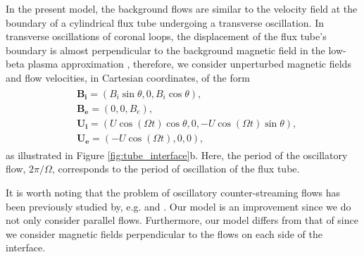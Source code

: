 \documentclass[12pt]{ociamthesis}
\begin{document}
In the present model, the background flows are similar to the velocity field at the boundary of a cylindrical flux tube undergoing a transverse oscillation.
In transverse oscillations of coronal loops, the displacement of the flux tube's boundary is almost perpendicular to the background magnetic field in the low-beta plasma approximation \citep[see, e.g.][]{Ruderman2007}, therefore, we consider unperturbed magnetic fields and flow velocities, in Cartesian coordinates, of the form
%
\begin{align}
\begin{split}
\label{eq:c3equilibrium}
& \mathbf{B_i} = (B_i \sin \theta, 0, B_i \cos \theta),
\\
& \mathbf{B_e} = (0, 0, B_e),
\\
& \mathbf{U_i} = (U \cos(\Omega t) \cos \theta, 0, - U \cos(\Omega t) \sin \theta),
\\
& \mathbf{U_e} = (- U \cos(\Omega t), 0, 0),
\end{split}
\end{align}
%
as illustrated in Figure \ref{fig:tube_interface}b.
Here, the period of the oscillatory flow, $2\pi / \Omega$, corresponds to the period of oscillation of the flux tube.

It is worth noting that the problem of oscillatory counter-streaming flows has been previously studied by, e.g. \cite{Kelly1965} and \cite{Roberts1973}.
Our model is an improvement since we do not only consider parallel flows.
Furthermore, our model differs from that of \cite{Roberts1973} since we consider magnetic fields perpendicular to the flows on each side of the interface.
\end{document}
